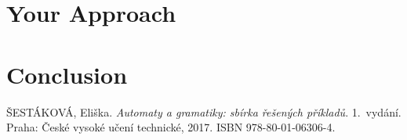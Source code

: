 \documentclass{article}
\begin{document}

\section{Your Approach}


\section{Conclusion}


\begin{thebibliography}{9}
ŠESTÁKOVÁ, Eliška. 
\textit{Automaty a gramatiky: sbírka řešených příkladů}.
1.~vydání. Praha: České vysoké učení technické, 2017. ISBN 978-80-01-06306-4.
\end{thebibliography}

\end{document}
